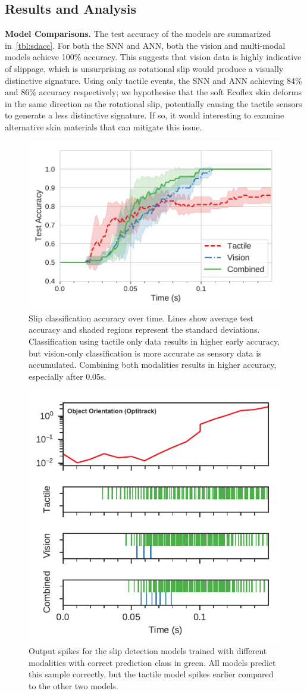 \documentclass[fyp]{socreport}
\begin{document}
\subsection{Results and Analysis}

\vspace{0.3em}
\noindent\textbf{Model Comparisons.}
The test accuracy of the models are summarized in~\autoref{tbl:sdacc}. For
both the SNN and ANN, both the vision and multi-modal models achieve 100\%
accuracy. This suggests that vision data is highly indicative of slippage, which
is unsurprising as rotational slip would produce a visually distinctive
signature. Using only tactile events, the SNN and ANN achieving 84\% and 86\%
accuracy respectively; we hypothesise that the soft Ecoflex skin deforms in the
same direction as the rotational slip, potentially causing the tactile sensors
to generate a less distinctive signature. If so, it would interesting to examine
alternative skin materials that can mitigate this issue.

\begin{figure}
\centering
\includegraphics[width=0.55\columnwidth]{images/analysis/slip_over_time.pdf}
\caption{Slip classification accuracy over time. Lines show average test
  accuracy and shaded regions represent the standard deviations. Classification
  using tactile only data results in higher early accuracy, but vision-only
  classification is more accurate as sensory data is accumulated. Combining both
  modalities results in higher accuracy, especially after 0.05s.\label{fig:sliptime}}
\end{figure}

\begin{figure}
\centering
\includegraphics[width=0.55\columnwidth]{images/analysis/slip_class_output.pdf}
\caption{Output spikes for the slip detection models trained with different modalities with correct prediction class in green. All models predict this sample correctly, but the tactile model spikes earlier compared to the other two models.\label{fig:spikeslip}}
\end{figure}
\end{document}
